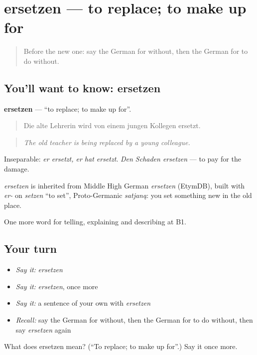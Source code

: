 \section[ersetzen]{ersetzen — to replace; to make up for}

\label{lesson:GE-C368-ersetzen}



\begin{quote}
Before the new one: say the German for without, then the German for to do without.
\end{quote}

\subsection*{You'll want to know: ersetzen}
\textbf{ersetzen} — \textquotedblleft{}to replace; to make up for\textquotedblright{}.

\begin{quote}
Die alte Lehrerin wird von einem jungen Kollegen ersetzt.
\end{quote}

\begin{quote}
\emph{The old teacher is being replaced by a young colleague.}
\end{quote}

Inseparable: \emph{er ersetzt, er hat ersetzt}. \emph{Den Schaden ersetzen} — to pay for the damage.

\begin{cousinweb}
\emph{ersetzen} is inherited from Middle High German \emph{ersetzen} (EtymDB), built with \emph{er-} on \emph{setzen} \textquotedblleft{}to set\textquotedblright{}, Proto-Germanic \emph{satjaną}: you set something new in the old place.
\end{cousinweb}

\begin{grammarlens}[title={What you've built}]
One more word for telling, explaining and describing at B1.
\end{grammarlens}

\subsection*{Your turn}
\begin{itemize}
\raggedright
  \item \emph{Say it:} \emph{ersetzen}
  \item \emph{Say it:} \emph{ersetzen}, once more
  \item \emph{Say it:} a sentence of your own with \emph{ersetzen}
  \item \emph{Recall:} say the German for without, then the German for to do without, then say \emph{ersetzen} again
\end{itemize}

\begin{tcolorbox}[breakable,colback=teal!4,colframe=teal!35!black,title={Before you move on}]
What does ersetzen mean? (\textquotedblleft{}To replace; to make up for\textquotedblright{}.) Say it once more.
\end{tcolorbox}
